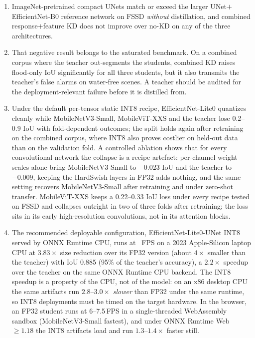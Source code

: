 \begin{enumerate}
\item ImageNet-pretrained compact UNets match or exceed the larger UNet$+$EfficientNet-B0 reference network on FSSD \emph{without} distillation, and combined response$+$feature KD does not improve over no-KD on any of the three architectures.
\item That negative result belongs to the saturated benchmark. On a combined corpus where the teacher out-segments the students, combined KD raises flood-only IoU significantly for all three students, but it also transmits the teacher's false alarms on water-free scenes. A teacher should be audited for the deployment-relevant failure before it is distilled from.
\item Under the default per-tensor static INT8 recipe, EfficientNet-Lite0 quantizes cleanly while MobileNetV3-Small, MobileViT-XXS and the teacher lose 0.2--0.9 IoU with fold-dependent outcomes; the split holds again after retraining on the combined corpus, where INT8 also proves costlier on held-out data than on the validation fold. A controlled ablation shows that for every convolutional network the collapse is a recipe artefact: per-channel weight scales alone bring MobileNetV3-Small to $-0.023$ IoU and the teacher to $-0.009$, keeping the HardSwish layers in FP32 adds nothing, and the same setting recovers MobileNetV3-Small after retraining and under zero-shot transfer. MobileViT-XXS keeps a 0.22--0.33 IoU loss under every recipe tested on FSSD and collapses outright in two of three folds after retraining; the loss sits in its early high-resolution convolutions, not in its attention blocks.
\item The recommended deployable configuration, EfficientNet-Lite0-UNet INT8 served by ONNX Runtime CPU, runs at \deployableMTwoFPS~FPS on a 2023 Apple-Silicon laptop CPU at $3.83\times$ size reduction over its FP32 version (about $4\times$ smaller than the teacher) with IoU 0.885 (95\% of the teacher's accuracy), a $2.2\times$ speedup over the teacher on the same ONNX Runtime CPU backend. The INT8 speedup is a property of the CPU, not of the model: on an x86 desktop CPU the same artifacts run $2.8$--$3.0\times$ \emph{slower} than FP32 under the same runtime, so INT8 deployments must be timed on the target hardware. In the browser, an FP32 student runs at 6--7.5\,FPS in a single-threaded WebAssembly sandbox (MobileNetV3-Small fastest), and under ONNX Runtime Web~$\geq 1.18$ the INT8 artifacts load and run $1.3$--$1.4\times$ faster still.

\end{enumerate}
